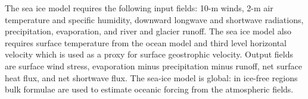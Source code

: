 The sea ice model requires the following input fields: 10-m winds, 2-m air
temperature and specific humidity, downward longwave and shortwave radiations,
precipitation, evaporation, and river and glacier runoff.  The sea ice model
also requires surface temperature from the ocean model and third level
horizontal velocity which is used as a proxy for surface geostrophic
velocity.  Output fields are surface wind stress, evaporation minus
precipitation minus runoff, net surface heat flux, and net shortwave flux.
The sea-ice model is global: in ice-free regions bulk formulae are used to
estimate oceanic forcing from the atmospheric fields.

